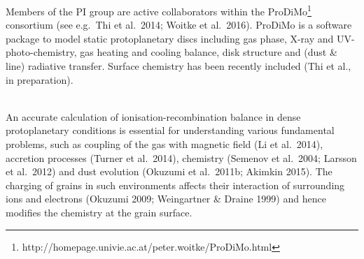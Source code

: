 \documentclass[10pt,fleqn,twoside]{article}
\begin{document}
Members of the PI group are active collaborators within the ProDiMo\footnote{http://homepage.univie.ac.at/peter.woitke/ProDiMo.html} consortium (see e.g.\ Thi et al.\ 2014; Woitke et al.\ 2016).  ProDiMo is a software package to model static protoplanetary discs including gas phase, X-ray and UV-photo-chemistry, gas heating and cooling balance, disk structure and (dust \& line) radiative transfer. Surface chemistry has been recently included (Thi et al., in preparation).

\vspace{0.5em}\\
An accurate calculation of ionisation-recombination balance in dense protoplanetary conditions is essential for
understanding various fundamental problems, such as coupling of the gas with magnetic field (Li et al.\ 2014), accretion
processes (Turner et al.\ 2014), chemistry (Semenov et al.\ 2004; Larsson et al.\ 2012) and dust evolution (Okuzumi et al.\ 2011b; Akimkin 2015). The charging of grains in such environments affects their interaction of surrounding ions and electrons
(Okuzumi 2009; Weingartner \& Draine 1999) and hence modifies the chemistry at the grain surface.
\end{document}
